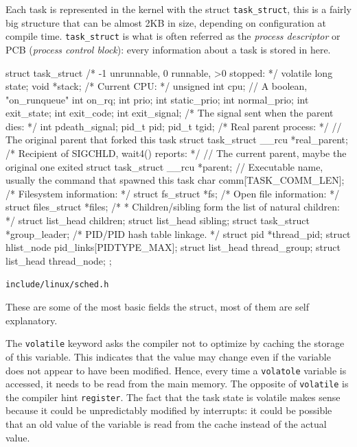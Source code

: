 \documentclass[10pt, oneside]{book}
\begin{document}
Each task is represented in the kernel with the struct \verb|task_struct|, this is a fairly big structure that can be almost 2KB in size, depending on configuration at compile time. \verb|task_struct| is what is often referred as the \textit{process descriptor} or PCB (\textit{process control block}): every information about a task is stored in here. 
\begin{code}
struct task_struct {
  /* -1 unrunnable, 0 runnable, >0 stopped: */
  volatile long     state;
  void        *stack;
  /* Current CPU: */
  unsigned int      cpu;
  // A boolean, "on_runqueue"
  int       on_rq; 
  int       prio;
  int       static_prio;
  int       normal_prio;
        int       exit_state;
  int       exit_code;
  int       exit_signal;
  /* The signal sent when the parent dies: */
  int       pdeath_signal;
  pid_t       pid;
  pid_t       tgid;
        /* Real parent process: */
        // The original parent that forked this task
  struct task_struct __rcu  *real_parent;
  /* Recipient of SIGCHLD, wait4() reports: */
  // The current parent, maybe the original one exited
  struct task_struct __rcu  *parent;
  // Executable name, usually the command that spawned this task
  char        comm[TASK_COMM_LEN]; 
        /* Filesystem information: */
  struct fs_struct       *fs;
  /* Open file information: */
  struct files_struct   *files;
  /*
   * Children/sibling form the list of natural children:
   */
  struct list_head    children;
  struct list_head    sibling;
  struct task_struct     *group_leader;
  /* PID/PID hash table linkage. */
  struct pid      *thread_pid;
  struct hlist_node    pid_links[PIDTYPE_MAX];
  struct list_head    thread_group;
  struct list_head    thread_node;
};
\end{code}
\verb|include/linux/sched.h|

These are some of the most basic fields the struct, most of them are self explanatory.

The \verb|volatile| keyword asks the compiler not to optimize by
caching the storage of this variable. This indicates that the value
may change even if the variable does not appear to have been
modified. Hence, every time a \texttt{volatole} variable is accessed,
it needs to be read from the main memory. The opposite of
\verb|volatile| is the compiler hint \verb|register|. The fact that
the task state is volatile makes sense because it could be
unpredictably modified by interrupts: it could be possible that an old
value of the variable is read from the cache instead of the actual
value.
\end{document}
